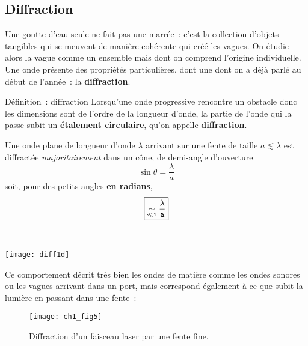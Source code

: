 \documentclass[../main/main.tex]{subfiles}
\begin{document}
\subsection{Diffraction}
\label{ssec:ondediff}
Une goutte d'eau seule ne fait pas une marrée~: c'est la collection d'objets
tangibles qui se meuvent de manière cohérente qui créé les vagues. On étudie
alors la vague comme un ensemble mais dont on comprend l'origine individuelle.
Une onde présente des propriétés particulières, dont une dont on a déjà parlé au
début de l'année~: la \textbf{diffraction}.
\begin{tdefi}{Définition~: diffraction}
	Lorsqu'une onde progressive rencontre un obstacle donc les dimensions sont de
	l'ordre de la longueur d'onde, la partie de l'onde qui la passe subit un
	\textbf{étalement circulaire}, qu'on appelle \textbf{diffraction}.
\end{tdefi}

\noindent
\begin{minipage}[t]{.5\linewidth}
	Une onde plane de longueur d'onde $\lambda$ arrivant sur une fente de taille
	$a \lesssim \lambda$ est diffractée \textit{majoritairement} dans un cône, de
	demi-angle d'ouverture
	\[
		\boxed{\sin{\theta} = \frac{\lambda}{a}}
	\]
	soit, pour des petits angles \textbf{en radians},
	\[
		\boxed{\tt \underset{\tt \ll 1}{\sim} \frac{\lambda}{a}}
	\]
\end{minipage}
\hfill
\begin{minipage}[t]{.45\linewidth}
	~
	\vspace*{-10pt}
	\begin{center}
		\texttt{[image: diff1d]}
		\label{fig:diff1d}
	\end{center}
\end{minipage}

Ce comportement décrit très bien les ondes de matière comme les ondes sonores ou
les vagues arrivant dans un port, mais correspond également à ce que subit la
lumière en passant dans une fente~:
\begin{figure}[h]
	\centering
	\texttt{[image: ch1\_fig5]}
	\caption{Diffraction d'un faisceau laser par une fente fine.}
	\label{fig:diff_las}
\end{figure}
\end{document}
